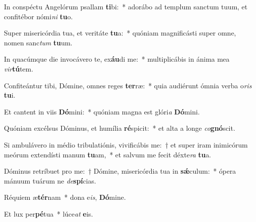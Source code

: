 \item In conspéctu Angelórum psallam \textbf{ti}bi:~* adorábo ad templum sanctum tuum, et confitébor nómi\textit{ni} \textbf{tu}o.

\item Super misericórdia tua, et veritáte \textbf{tu}a:~* quóniam magnificásti super omne, nomen sanc\textit{tum} \textbf{tu}um.

\item In quacúmque die invocávero te, ex\textbf{áu}di me:~* multiplicábis in ánima mea \textit{vir}\textbf{tú}tem.

\item Confiteántur tibi, Dómine, omnes reges \textbf{ter}ræ:~* quia audiérunt ómnia verba o\textit{ris} \textbf{tu}i.

\item Et cantent in viis \textbf{Dó}mini:~* quóniam magna est glóri\textit{a} \textbf{Dó}mini.

\item Quóniam excélsus Dóminus, et humília \textbf{ré}spicit:~* et alta a longe \textit{co}\textbf{gnó}scit.

\item Si ambulávero in médio tribulatiónis, vivificábis me:~† et super iram inimicórum meórum extendísti manum \textbf{tu}am,~* et salvum me fecit déxte\textit{ra} \textbf{tu}a.

\item Dóminus retríbuet pro me:~† Dómine, misericórdia tua in \textbf{sǽ}culum:~* ópera mánuum tuárum ne \textit{de}\textbf{spí}cias.

\item Réquiem æ\textbf{tér}nam~* dona e\textit{is}, \textbf{Dó}mine.

\item Et lux per\textbf{pé}tua~* lúce\textit{at} \textbf{e}is.